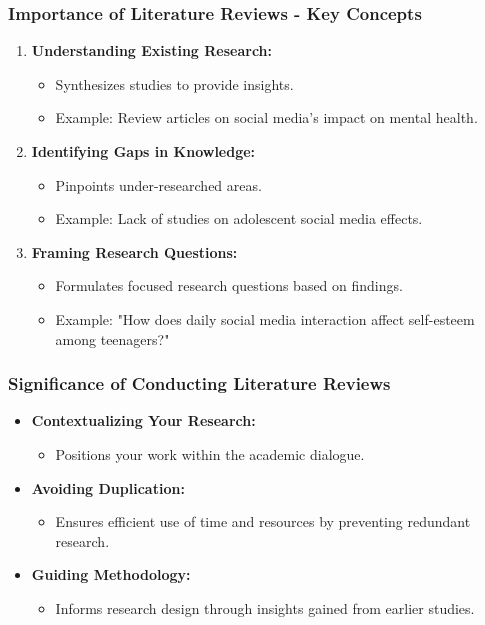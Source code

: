 \documentclass[aspectratio=169]{beamer}
\begin{document}
\begin{frame}[fragile]
    \frametitle{Importance of Literature Reviews - Key Concepts}
    \begin{enumerate}
        \item \textbf{Understanding Existing Research:}
            \begin{itemize}
                \item Synthesizes studies to provide insights.
                \item Example: Review articles on social media's impact on mental health.
            \end{itemize}
        
        \item \textbf{Identifying Gaps in Knowledge:}
            \begin{itemize}
                \item Pinpoints under-researched areas.
                \item Example: Lack of studies on adolescent social media effects.
            \end{itemize}
        
        \item \textbf{Framing Research Questions:}
            \begin{itemize}
                \item Formulates focused research questions based on findings.
                \item Example: "How does daily social media interaction affect self-esteem among teenagers?"
            \end{itemize}
    \end{enumerate}
\end{frame}

\begin{frame}[fragile]
    \frametitle{Significance of Conducting Literature Reviews}
    \begin{itemize}
        \item \textbf{Contextualizing Your Research:}
            \begin{itemize}
                \item Positions your work within the academic dialogue.
            \end{itemize}
        
        \item \textbf{Avoiding Duplication:}
            \begin{itemize}
                \item Ensures efficient use of time and resources by preventing redundant research.
            \end{itemize}
        
        \item \textbf{Guiding Methodology:}
            \begin{itemize}
                \item Informs research design through insights gained from earlier studies.
            \end{itemize}
    \end{itemize}
\end{frame}
\end{document}
